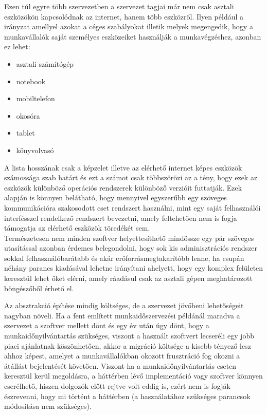 Ezen túl egyre több szervezetben a szervezet tagjai már nem csak asztali eszközökön kapcsolódnak az internet, hanem több eszközről. Ilyen például a  irányzat amellyel azokat a céges szabályokat illetik melyek megengedik, hogy a munkavállalók saját személyes eszközeiket használják a munkavégzéshez, azonban ez lehet:

\begin{itemize}
  \item asztali számítógép
  \item notebook
  \item mobiltelefon
  \item okosóra
  \item tablet
  \item könyvolvasó
\end{itemize}

A lista hosszának csak a képzelet illetve az elérhető internet képes eszközök számossága szab határt és ezt a számot csak többszörözi az a tény, hogy ezek az eszközök különböző operációs rendszerek különböző verzióit futtatják. Ezek alapján is könnyen belátható, hogy mennyivel egyszerűbb egy szöveges kommunikációra szakosodott cset rendszert használni, mint egy saját felhasználói interfésszel rendelkező rendszert bevezetni, amely feltehetően nem is fogja támogatja az elérhető eszközök töredékét sem.\\
\newline
Természetesen nem minden szoftver helyettesíthető mindössze egy pár szöveges utasítással azonban érdemes belegondolni, hogy sok kis adminisztrációs rendszer sokkal felhasználóbarátabb és akár erőforrásmegtakarítóbb lenne, ha csupán néhány parancs kiadásával lehetne irányítani ahelyett, hogy egy komplex felületen keresztül lehet őket elérni, amely ráadásul csak az asztali gépen meghatározott böngészőből érhető el.

Az absztrakció építése mindig költséges, de a szervezet jövőbeni lehetőségeit nagyban növeli. Ha a fent említett munkaidőszervezési példánál maradva a szervezet a szoftver mellett dönt és egy év után úgy dönt, hogy a munkaidőnyilvántartás szükséges, viszont a használt szoftvert lecseréli egy jobb piaci ajánlatnak köszönhetően, akkor a migráció költsége a kisebb tényező lesz ahhoz képest, amelyet a munkavállalókban okozott frusztráció fog okozni a átállást bejelentését követően. Viszont ha a munkaidőnyilvántartás cseten keresztül kerül megoldásra, a háttérben lévő implementáció vagy szoftver könnyen cserélhető, hiszen dolgozók előtt rejtve volt eddig is, ezért nem is fogják észrevenni, hogy mi történt a háttérben (a használatához szükséges parancsok módosítása nem szükséges).

